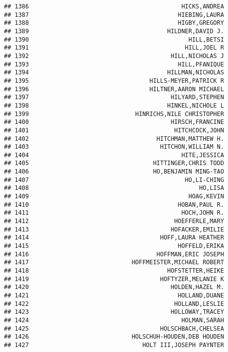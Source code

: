 \documentclass[
]{article}
\begin{document}
\begin{verbatim}
## 1386                                           HICKS,ANDREA
## 1387                                          HIEBING,LAURA
## 1388                                          HIGBY,GREGORY
## 1389                                       HILDNER,DAVID J.
## 1390                                             HILL,BETSI
## 1391                                            HILL,JOEL R
## 1392                                        HILL,NICHOLAS J
## 1393                                          HILL,PFANIQUE
## 1394                                       HILLMAN,NICHOLAS
## 1395                                  HILLS-MEYER,PATRICK R
## 1396                                  HILTNER,AARON MICHAEL
## 1397                                        HILYARD,STEPHEN
## 1398                                       HINKEL,NICHOLE L
## 1399                              HINRICHS,NILE CHRISTOPHER
## 1400                                        HIRSCH,FRANCINE
## 1401                                         HITCHCOCK,JOHN
## 1402                                    HITCHMAN,MATTHEW H.
## 1403                                     HITCHON,WILLIAM N.
## 1404                                           HITE,JESSICA
## 1405                                   HITTINGER,CHRIS TODD
## 1406                                   HO,BENJAMIN MING-TAO
## 1407                                            HO,LI-CHING
## 1408                                                HO,LISA
## 1409                                             HOAG,KEVIN
## 1410                                          HOBAN,PAUL R.
## 1411                                           HOCH,JOHN R.
## 1412                                         HOEFFERLE,MARY
## 1413                                        HOFACKER,EMILIE
## 1414                                     HOFF,LAURA HEATHER
## 1415                                          HOFFELD,ERIKA
## 1416                                    HOFFMAN,ERIC JOSEPH
## 1417                             HOFFMEISTER,MICHAEL ROBERT
## 1418                                       HOFSTETTER,HEIKE
## 1419                                     HOFTYZER,MELANIE K
## 1420                                        HOLDEN,HAZEL M.
## 1421                                          HOLLAND,DUANE
## 1422                                         HOLLAND,LESLIE
## 1423                                        HOLLOWAY,TRACEY
## 1424                                           HOLMAN,SARAH
## 1425                                     HOLSCHBACH,CHELSEA
## 1426                             HOLSCHUH-HOUDEN,DEB HOUDEN
## 1427                                HOLT III,JOSEPH PAYNTER

\end{verbatim}
\end{document}
